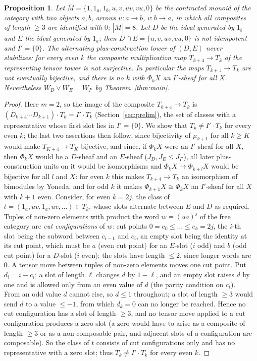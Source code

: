 \documentclass[11pt]{amsart}
\newtheorem{prop}[thm]{Proposition}
\theoremstyle{definition}
\begin{document}
\begin{prop}\label{prop:nil}
Let $\overline M=\{1,1_a,1_b,u,v,uv,vu,0\}$ be the contracted monoid of the
category with two objects $a,b$, arrows $u\colon a\to b$, $v\colon b\to a$, in
which all composites of length $\ge3$ are identified with $0$; $|\overline M|=8$.
Let $D$ be the ideal generated by $1_b$ and $E$ the ideal generated by $1_a$;
then $D\cap E=\{u,v,uv,vu,0\}$ is not idempotent and $I'=\{0\}$. The
alternating plus-construction tower of $(D,E)$ never stabilizes: for every
even $k$ the composite multiplication map $T_{k+4}\to T_k$ of the
representing tensor tower is not surjective. In particular the maps
$T_{k+1}\to T_k$ are not eventually bijective, and there is no $k$ with
$\Phi_kX$ an $I'$-sheaf for all $X$. Nevertheless $W_D\vee W_E=W_{I'}$ by
Theorem~\ref{thm:main}.
\end{prop}
\begin{proof}
Here $m=2$, so the image of the composite $T_{k+4}\to T_k$ is
$(D_{k+4}\cdots D_{k+1})\cdot T_k=I'\cdot T_k$ (Section~\ref{sec:prelim}),
the set of classes with a representative whose first slot lies in
$I'=\{0\}$. We show that $T_k\ne I'\cdot T_k$ for every even $k$; the last
two assertions then follow, since bijectivity of $\mu_{k+1}$ for all $k\ge K$
would make $T_{K+4}\to T_K$ bijective, and since, if $\Phi_kX$ were an
$I'$-sheaf for all $X$, then $\Phi_kX$ would be a $D$-sheaf and an $E$-sheaf
($J_D,J_E\le J_{I'}$), all later plus-construction units on it would be
isomorphisms and $\Phi_kX\to\Phi_{k+l}X$ would be bijective for all $l$ and
$X$: for even $k$ this makes $T_{k+4}\to T_k$ an isomorphism of bimodules by
Yoneda, and for odd $k$ it makes $\Phi_{k+1}X\cong\Phi_kX$ an $I'$-sheaf for
all $X$ with $k+1$ even. Consider, for even $k=2j$, the class
of $t=(1_a,uv,1_a,uv,\dots)\in T_k$, whose slots alternate between $E$ and $D$
as required. Tuples of non-zero elements with product the word $w=(uv)^j$ of
the free category are \emph{cut configurations} of $w$: cut points
$0=c_0\le\dots\le c_k=2j$, the $i$-th slot being the subword between $c_{i-1}$
and $c_i$, an empty slot being the identity at its cut point, which must be
$a$ (even cut point) for an $E$-slot ($i$ odd) and $b$ (odd cut point) for a
$D$-slot ($i$ even); the slots have length $\le2$, since longer words are $0$.
A tensor move between tuples of non-zero elements moves one cut point. Put
$d_i=i-c_i$; a slot of length $\ell$ changes $d$ by $1-\ell$, and an empty
slot raises $d$ by one and is allowed only from an even value of $d$ (the
parity condition on $c_i$). From an odd value $d$ cannot rise, so $d\le1$
throughout; a slot of length $\ge3$ would send $d$ to a value $\le-1$, from
which $d_k=0$ can no longer be reached. Hence no cut configuration has a slot
of length $\ge3$, and no tensor move applied to a cut configuration produces a
zero slot (a zero would have to arise as a composite of length $\ge3$ or as a
non-composable pair, and adjacent slots of a configuration are composable). So
the class of $t$ consists of cut configurations only and has no representative
with a zero slot; thus $T_k\ne I'\cdot T_k$ for every even $k$.
\end{proof}
\end{document}
